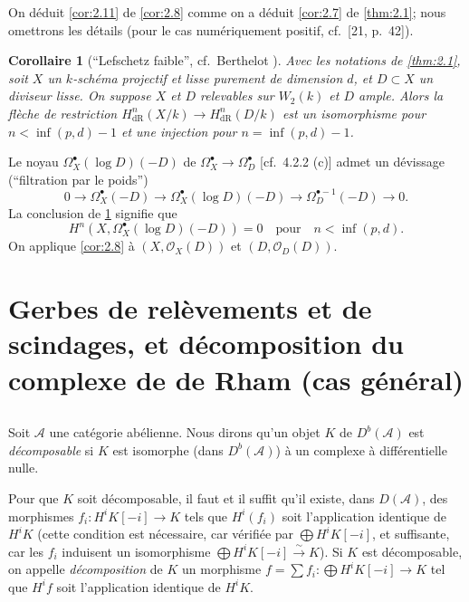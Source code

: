 \documentclass[12pt,a4paper]{article}
\theoremstyle{plain}
\newtheorem{corollary}[theorem]{Corollaire}
\theoremstyle{definition}
\theoremstyle{remark}
\newcommand{\cO}{\mathcal{O}}
\newcommand{\dR}{\text{dR}}
\begin{document}
On d\'eduit \ref{cor:2.11} de \ref{cor:2.8} comme on a d\'eduit \ref{cor:2.7} de \ref{thm:2.1}; nous omettrons les d\'etails (pour le cas num\'eriquement positif, cf.~[21, p.~42]).

\begin{corollary}[``Lefschetz faible'', cf.~Berthelot {\cite{2}}]\label{cor:2.12}
Avec les notations de \ref{thm:2.1}, soit $X$ un $k$-sch\'ema projectif et lisse purement de dimension $d$, et $D \subset X$ un diviseur lisse. On suppose $X$ et $D$ relevables sur $W_2(k)$ et $D$ ample. Alors la fl\`eche de restriction $H^n_{\dR}(X/k) \to H^n_{\dR}(D/k)$ est un isomorphisme pour $n < \inf(p, d) - 1$ et une injection pour $n = \inf(p, d) - 1$.
\end{corollary}

Le noyau $\Omega^{\bullet}_X(\log D)(-D)$ de $\Omega^{\bullet}_X \to \Omega^{\bullet}_D$ [cf.~4.2.2 (c)] admet un d\'evissage (``filtration par le poids'')
\[
0 \to \Omega^{\bullet}_X(-D) \to \Omega^{\bullet}_X(\log D)(-D) \to \Omega^{\bullet-1}_D(-D) \to 0.
\]
La conclusion de \ref{cor:2.12} signifie que
\[
H^n(X, \Omega^{\bullet}_X(\log D)(-D)) = 0 \quad \text{pour} \quad n < \inf(p, d).
\]
On applique \ref{cor:2.8} \`a $(X, \cO_X(D))$ et $(D, \cO_D(D))$.

\section{Gerbes de rel\`evements et de scindages, et d\'ecomposition du complexe de de Rham (cas g\'en\'eral)}

\subsection{}

Soit $\mathcal{A}$ une cat\'egorie ab\'elienne. Nous dirons qu'un objet $K$ de $D^b(\mathcal{A})$ est \emph{d\'ecomposable} si $K$ est isomorphe (dans $D^b(\mathcal{A})$) \`a un complexe \`a diff\'erentielle nulle.

Pour que $K$ soit d\'ecomposable, il faut et il suffit qu'il existe, dans $D(\mathcal{A})$, des morphismes $f_i: H^i K[-i] \to K$ tels que $H^i(f_i)$ soit l'application identique de $H^i K$ (cette condition est n\'ecessaire, car v\'erifi\'ee par $\bigoplus H^i K[-i]$, et suffisante, car les $f_i$ induisent un isomorphisme $\bigoplus H^i K[-i] \xrightarrow{\sim} K$). Si $K$ est d\'ecomposable, on appelle \emph{d\'ecomposition} de $K$ un morphisme $f = \sum f_i: \bigoplus H^i K[-i] \to K$ tel que $H^i f$ soit l'application identique de $H^i K$.
\end{document}
